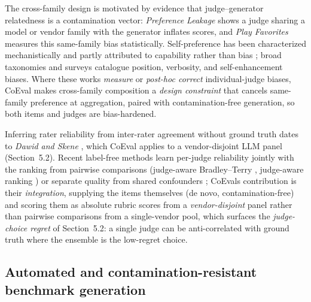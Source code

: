 \documentclass[11pt,a4paper]{article}
\begin{document}
The cross-family design is motivated by evidence that judge--generator relatedness is a contamination vector:
\emph{Preference Leakage} \citep{ref15} shows a judge sharing a model or vendor family with the generator
inflates scores, and \emph{Play Favorites} \citep{ref16} measures this same-family bias statistically.
Self-preference has been characterized mechanistically \citep{ref18} and partly attributed to capability
rather than bias \citep{ref24}; broad taxonomies and surveys \citep{ref17, ref19, ref20} catalogue position, verbosity, and self-enhancement biases. Where these works \emph{measure} or
\emph{post-hoc correct} individual-judge biases, CoEval makes cross-family composition a \emph{design constraint}
that cancels same-family preference at aggregation, paired with contamination-free generation, so both items and judges
are bias-hardened.

Inferring rater reliability from inter-rater agreement without ground truth dates to \emph{Dawid and Skene}
\citep{ref33}, which CoEval applies to a vendor-disjoint LLM panel (Section~5.2). Recent label-free
methods learn per-judge reliability jointly with the ranking from pairwise comparisons (judge-aware Bradley--Terry
\citep{ref27}, judge-aware ranking \citep{ref29}) or separate quality from shared confounders
\citep{ref28}; CoEval\textquotesingle s contribution is their \emph{integration}, supplying the items themselves (de novo,
contamination-free) and scoring them as absolute rubric scores from a \emph{vendor-disjoint} panel rather than
pairwise comparisons from a single-vendor pool, which surfaces the \emph{judge-choice regret} of Section~5.2: a
single judge can be anti-correlated with ground truth where the ensemble is the low-regret choice.

\subsection{Automated and contamination-resistant benchmark generation}\label{automated-and-contamination-resistant-benchmark-generation}
\end{document}
